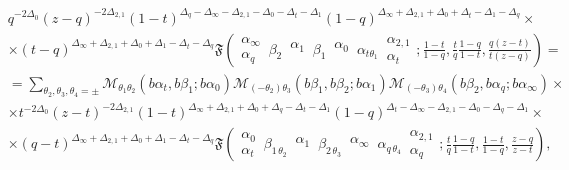 \documentclass[11pt]{article}
\numberwithin{equation}{section}
\begin{document}
\begin{equation}
\begin{aligned}
&q^{-2\Delta_{0}}(z-q)^{-2\Delta_{2,1}}(1-t)^{\Delta_{q}-\Delta_{\infty}-\Delta_{2,1}-\Delta_0-\Delta_t-\Delta_1}(1-q)^{\Delta_{\infty}+\Delta_{2,1}+\Delta_0+\Delta_t-\Delta_1-\Delta_{q}}\times\\
&\times (t-q)^{\Delta_{\infty}+\Delta_{2,1}+\Delta_0+\Delta_1-\Delta_t-\Delta_{q}}\mathfrak{F}\left( \begin{matrix} \alpha_{\infty} \\ \alpha_{q} \end{matrix} \, \beta_2 \, \begin{matrix} \alpha_1  \\ \, \end{matrix} \,\beta_1 \, \begin{matrix} \alpha_0 \\ \, \end{matrix} \,\alpha_{t\theta_1} \, \begin{matrix} \alpha_{2,1} \\ \alpha_t \end{matrix} ; \frac{1-t}{1-q},\frac{t}{q}\frac{1-q}{1-t},\frac{q(z-t)}{t(z-q)} \right)=\\
&=\sum_{\theta_2,\theta_3,\theta_4=\pm}\mathcal{M}_{\theta_1\theta_2}(b\alpha_t,b\beta_1;b\alpha_0)\mathcal{M}_{(-\theta_2)\theta_3}(b\beta_1,b\beta_2;b\alpha_1)\mathcal{M}_{(-\theta_3)\theta_4}(b\beta_2,b\alpha_{q};b\alpha_{\infty})\times\\
&\times t^{-2\Delta_0}(z-t)^{-2\Delta_{2,1}}(1-t)^{\Delta_{\infty}+\Delta_{2,1}+\Delta_0+\Delta_{q}-\Delta_t-\Delta_1}(1-q)^{\Delta_{t}-\Delta_{\infty}-\Delta_{2,1}-\Delta_0-\Delta_{q}-\Delta_1}\times\\
&\times(q-t)^{\Delta_{\infty}+\Delta_{2,1}+\Delta_0+\Delta_1-\Delta_t-\Delta_{q}}\mathfrak{F}\left( \begin{matrix} \alpha_{0} \\ \alpha_{t} \end{matrix} \, \beta_{1\,\theta_2} \, \begin{matrix} \alpha_1  \\ \, \end{matrix} \,\beta_{2\,\theta_3} \, \begin{matrix} \alpha_{\infty} \\ \, \end{matrix} \,\alpha_{q\,\theta_4} \, \begin{matrix} \alpha_{2,1} \\ \alpha_{q} \end{matrix} ; \frac{t}{q}\frac{1-q}{1-t},\frac{1-t}{1-q},\frac{z-q}{z-t} \right),
\end{aligned}
\end{equation}
\end{document}

